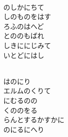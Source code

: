 \documentclass[10pt,b5j]{tarticle} %
\begin{document}
\begin{enumerate}
\begin{minipage}[c]{\blocksize}
    \end{minipage}
    \begin{minipage}[c]{\blocksize}
        
        \vspace{\linespace}
        \item~\\
        のしかにちて\\
        しのものをはす\\
        ろふのはへど\\
        とののもばれ\\
        しきににじみて\\
        いとどにはし
        
    \end{minipage}
    \begin{minipage}[c]{\blocksize}
        
        \vspace{\linespace}
        \item~\\
        はのにり\\
        エルムのくりて\\
        にむるのの\\
        くののをる\\
        らんとするかすかに\\
        のにるにへり
        
    \end{minipage}
    \begin{minipage}[c]{\blocksize}
        

\end{minipage}
\end{enumerate}
\end{document}
